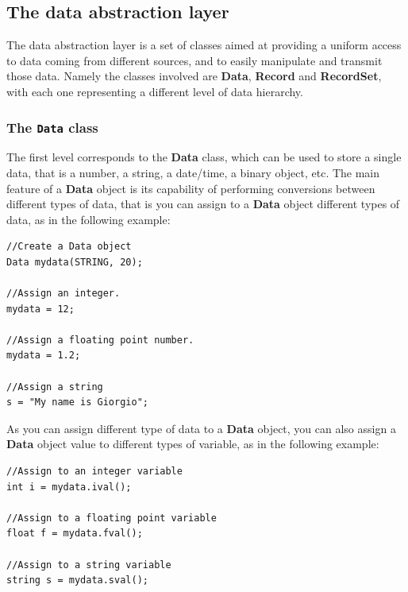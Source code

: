 \documentclass[12pt,titlepage]{article}
\begin{document}
%
\subsection{The data abstraction layer}
\label{sec:The data abstraction layer}
The data abstraction layer is a set of classes aimed at providing a
uniform access to data coming from different sources, and to easily
manipulate and transmit those data. Namely the classes involved are
\textbf{Data}, \textbf{Record} and \textbf{RecordSet}, with each one
representing a different level of data hierarchy.

\subsubsection{The \texttt{Data} class}
\label{sec:The Data class}
The first level corresponds to the \textbf{Data} class, which can be
used to store a single data, that is a number, a string, a date/time,
a binary object, etc. The main feature of a \textbf{Data} object is
its capability of performing conversions between different types of
data, that is you can assign to a \textbf{Data} object different types
of data, as in the following example:

\begin{lstlisting}
//Create a Data object
Data mydata(STRING, 20);

//Assign an integer.
mydata = 12;

//Assign a floating point number.
mydata = 1.2;

//Assign a string
s = "My name is Giorgio";
\end{lstlisting}

\noindent
As you can assign different type of data to a \textbf{Data} object,
you can also assign a \textbf{Data} object value to different types
of variable, as in the following example:

\begin{lstlisting}
//Assign to an integer variable
int i = mydata.ival();

//Assign to a floating point variable
float f = mydata.fval();

//Assign to a string variable
string s = mydata.sval();
\end{lstlisting}
\end{document}
